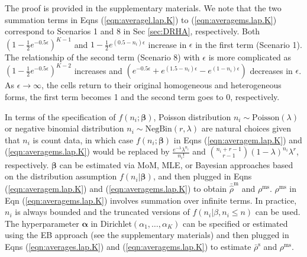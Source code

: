\documentclass[10pt,journal,compsoc]{IEEEtran}
\newcommand{\bs}{\boldsymbol}
\begin{document}
The proof is provided in the supplementary materials.  We note that the two summation terms in Eqns (\ref{eqn:averagel.lap.K}) to (\ref{eqn:averagems.lap.K}) correspond to Scenarios 1 and 8 in Sec \ref{sec:DRHA}, respectively. Both $(1\!-\!\frac{1}{2}e^{-0.5\epsilon})^{K-1}$ and $1\!-\!\frac{1}{2}e^{(0.5-n_i)\epsilon}$ increase in $\epsilon$ in the first term (Scenario 1). The  relationship of the second term  (Scenario 8) with $\epsilon$ is more complicated as $(1\!-\!\frac{1}{2}e^{-0.5\epsilon})^{K-2}$ increases and $(e^{-0.5\epsilon}+e^{(1.5-n_i)\epsilon}-e^{(1-n_i)\epsilon})$ decreases in $\epsilon$.   As $\epsilon\rightarrow\infty$, the cells return to their original homogeneous and heterogeneous forms, the first term becomes 1 and  the second term goes to 0, respectively.  

In terms of the specification of $f(n_i;\bs\beta)$, Poisson distribution $n_i\sim \mbox{Poisson}(\lambda)$ or negative binomial distribution  $n_i\sim \mbox{NegBin}(r,\lambda)$ are natural choices given that $n_i$ is count data, in which case $f(n_i;\bs\beta)$ in  Eqns (\ref{eqn:averagem.lap.K}) and (\ref{eqn:averagems.lap.K})  would be replaced by $\frac{e^{-\lambda}\lambda^{n_i}}{n_i!}$  and  $\binom{n_i+r-1}{r-1}(1-\lambda)^{n_i}\lambda^r$, respectively. $\bs\beta$ can be estimated via MoM, MLE, or Bayesian approaches based on the distribution assumption $f(n_i|\bs\beta)$, and then plugged in  Eqns (\ref{eqn:averagem.lap.K}) and  (\ref{eqn:averagems.lap.K}) to obtain $\bar{\hat{\rho}}^{\text{m}}$ and $\rho^{\text{ms}}$.  $\rho^{\text{ms}}$ in Eqn (\ref{eqn:averagems.lap.K}) involves summation over infinite terms. In practice, $n_i$ is always bounded and the truncated versions of $f(n_i|\beta, n_i\le n)$ can be used.  The hyperparameter $\bs\alpha$ in Dirichlet$(\alpha_1,\ldots,\alpha_K)$ can be specified or estimated using the EB approach (see the supplementary materials) and then plugged in Eqns (\ref{eqn:averages.lap.K}) and  (\ref{eqn:averagems.lap.K}) to estimate $\bar\rho^{\text{s}}$ and  $\rho^{\text{ms}}$. 
\end{document}
